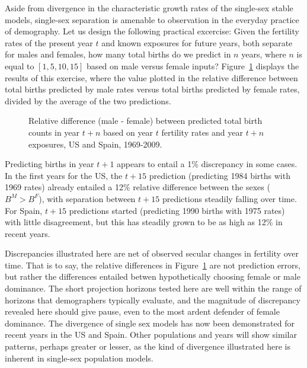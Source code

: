 
Aside from divergence in the characteristic growth rates of the single-sex
stable models, single-sex separation is amenable to observation in the everyday
practice of demography. Let us design the following practical excercise:
Given the fertility rates of the present year $t$ and known exposures for
future years, both separate for males and females, how many total births do we
predict in $n$ years, where $n$ is equal to $[1, 5, 10, 15]$ based on male
versus female inputs? Figure~\ref{fig:BirthCountDivergenceAge} displays the
results of this exercise, where the value plotted in the relative difference
between total births predicted by male rates versus total births predicted by
female rates, divided by the average of the two predictions.

\begin{figure}[ht!]
        \centering  
          \caption{Relative difference (male - female) between predicted total
          birth counts in year $t+n$ based on year $t$ fertility rates and year $t+n$ exposures, US and Spain, 1969-2009.}
          \label{fig:BirthCountDivergenceAge}
\end{figure}

Predicting births in year $t+1$ appears to entail a 1\% discrepancy in some
cases. In the first years for the US, the $t+15$ prediction (predicting
1984 births with 1969 rates) already entailed a 12\% relative difference
between the sexes ($B^M > B^F$), with separation between $t+15$ predictions
steadily falling over time. For Spain, $t+15$ predictions started (predicting 1990
births with 1975 rates) with little disagreement, but this has steadily grown to be as high
as 12\% in recent years.

Discrepancies illustrated here are net of observed secular changes in
fertility over time. That is to say, the relative differences in
Figure~\ref{fig:BirthCountDivergenceAge} are not prediction errors, but rather
the differences entailed betwen hypothetically choosing female or male
dominance. The short projection horizons tested here are well within the range
of horizons that demographers typically evaluate, and the magnitude of
discrepancy revealed here should give pause, even to the most ardent defender
of female dominance. The divergence of single sex
models has now been demonstrated for recent years in the US and Spain. Other
populations and years will show similar patterns, perhaps greater or lesser, as
the kind of divergence illustrated here is inherent in single-sex
population models.

